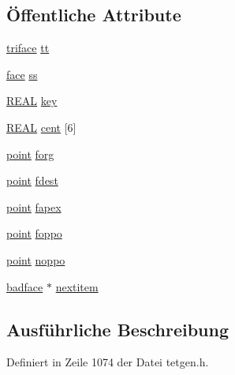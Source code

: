 \subsection*{Öffentliche Attribute}
\begin{DoxyCompactItemize}
\item 
\hyperlink{classtetgenmesh_1_1triface}{triface} \hyperlink{classtetgenmesh_1_1badface_a01d24569e6058b3dae1a31e0638b849c}{tt}
\item 
\hyperlink{classtetgenmesh_1_1face}{face} \hyperlink{classtetgenmesh_1_1badface_ace098878b5e89ec387c959d8acd0153d}{ss}
\item 
\hyperlink{tetgen_8h_a4b654506f18b8bfd61ad2a29a7e38c25}{R\-E\-A\-L} \hyperlink{classtetgenmesh_1_1badface_ac94189eb4b728abd589597c89db9a1d7}{key}
\item 
\hyperlink{tetgen_8h_a4b654506f18b8bfd61ad2a29a7e38c25}{R\-E\-A\-L} \hyperlink{classtetgenmesh_1_1badface_a72958cf685f881af15213f0925ccf72a}{cent} \mbox{[}6\mbox{]}
\item 
\hyperlink{classtetgenmesh_ace3fb4f80389185b7c9b18ab69a3dea2}{point} \hyperlink{classtetgenmesh_1_1badface_a620b94f643bafaa7a4dbfeba7063a445}{forg}
\item 
\hyperlink{classtetgenmesh_ace3fb4f80389185b7c9b18ab69a3dea2}{point} \hyperlink{classtetgenmesh_1_1badface_a8e010478b28c997ad9b441d05df47695}{fdest}
\item 
\hyperlink{classtetgenmesh_ace3fb4f80389185b7c9b18ab69a3dea2}{point} \hyperlink{classtetgenmesh_1_1badface_a617348221ce387b323575110a5c79627}{fapex}
\item 
\hyperlink{classtetgenmesh_ace3fb4f80389185b7c9b18ab69a3dea2}{point} \hyperlink{classtetgenmesh_1_1badface_a8e9966e480c210ac83ab0a4c221a7000}{foppo}
\item 
\hyperlink{classtetgenmesh_ace3fb4f80389185b7c9b18ab69a3dea2}{point} \hyperlink{classtetgenmesh_1_1badface_ada4ec358fcf9261b2f14cff307e66fdf}{noppo}
\item 
\hyperlink{classtetgenmesh_1_1badface}{badface} $\ast$ \hyperlink{classtetgenmesh_1_1badface_ae87a801b03dbaa3dd5709ffed5eef5bc}{nextitem}
\end{DoxyCompactItemize}


\subsection{Ausführliche Beschreibung}


Definiert in Zeile 1074 der Datei tetgen.\-h.



